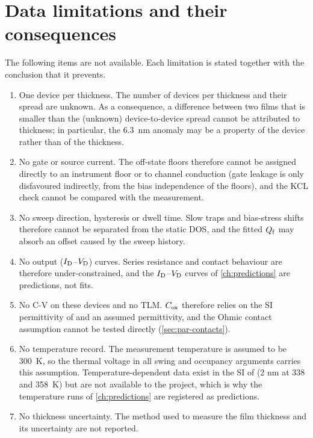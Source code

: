 \section{Data limitations and their consequences}\label{sec:inp-limitations}

The following items are not available. Each limitation is stated together with the conclusion that it prevents.

\begin{enumerate}
  \item One device per thickness. The number of devices per thickness and their spread are unknown. As a consequence,
        a difference between two films that is smaller than the (unknown) device-to-device spread cannot be
        attributed to thickness; in particular, the \SI{6.3}{nm} anomaly may be a property of the device rather than
        of the thickness.
  \item No gate or source current. The off-state floors therefore cannot be assigned directly to an instrument floor
        or to channel conduction (gate leakage is only disfavoured indirectly, from the bias independence of the
        floors), and the KCL check cannot be compared with the measurement.
  \item No sweep direction, hysteresis or dwell time. Slow traps and bias-stress shifts therefore cannot be separated
        from the static DOS, and the fitted $Q_{\mathrm{f}}$ may absorb an offset caused by the sweep history.
  \item No output ($I_{\mathrm{D}}$--$V_{\mathrm{D}}$) curves. Series resistance and contact behaviour are therefore under-constrained, and
        the $I_{\mathrm{D}}$--$V_{\mathrm{D}}$ curves of \cref{ch:predictions} are predictions, not fits.
  \item No C-V on these devices and no TLM. $C_{\mathrm{ox}}$ therefore relies on the SI permittivity of \HfO{} and an assumed
        \AlO{} permittivity, and the Ohmic contact assumption cannot be tested directly (\cref{sec:par-contacts}).
  \item No temperature record. The measurement temperature is assumed to be \SI{300}{K}, so the thermal voltage in all
        swing and occupancy arguments carries this assumption. Temperature-dependent data exist in the SI of
        \citet[SI Fig.~S12, caption on p.~11]{Januar2026} (2 nm at 338 and \SI{358}{K}) but are not available to the
        project, which is why the temperature runs of \cref{ch:predictions} are registered as predictions.
  \item No thickness uncertainty. The method used to measure the film thickness and its uncertainty are not reported.

\end{enumerate}

